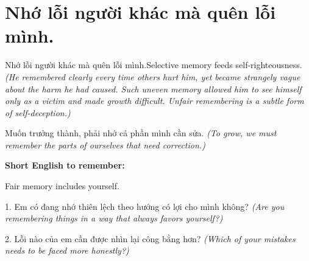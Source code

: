 \section{Nhớ lỗi người khác mà quên lỗi mình.}
\begin{truyen}{Nhớ lỗi người khác mà quên lỗi mình.}{Selective memory feeds self-righteousness.}
\textit{(He remembered clearly every time others hurt him, yet became strangely vague about the harm he had caused. Such uneven memory allowed him to see himself only as a victim and made growth difficult. Unfair remembering is a subtle form of self-deception.)}
\end{truyen}
\begin{baihoc}
Muốn trưởng thành, phải nhớ cả phần mình cần sửa.
\textit{(To grow, we must remember the parts of ourselves that need correction.)}
\end{baihoc}
\begin{ghinhoanh}
\textbf{Short English to remember:}

Fair memory includes yourself.
\end{ghinhoanh}
\begin{tuhocnhanh}
1. Em có đang nhớ thiên lệch theo hướng có lợi cho mình không? \textit{(Are you remembering things in a way that always favors yourself?)}

2. Lỗi nào của em cần được nhìn lại công bằng hơn? \textit{(Which of your mistakes needs to be faced more honestly?)}
\end{tuhocnhanh}
\ngancach

